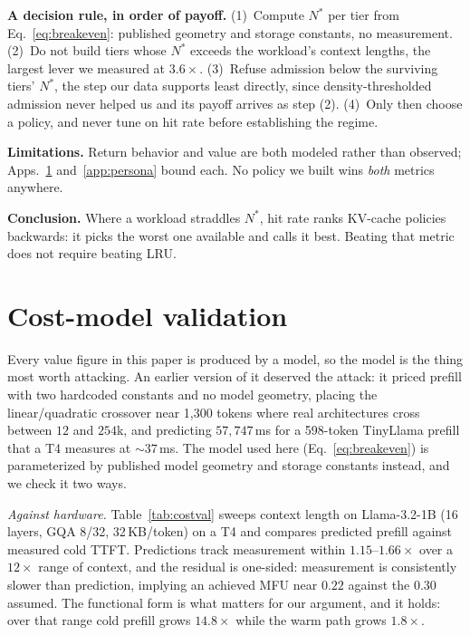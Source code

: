 \documentclass{article}
\begin{document}
\textbf{A decision rule, in order of payoff.} (1)~Compute $N^{*}$ per tier from Eq.~\ref{eq:breakeven}: published geometry and storage constants, no measurement. (2)~Do not build tiers whose $N^{*}$ exceeds the workload's context lengths, the largest lever we measured at $3.6\times$. (3)~Refuse admission below the surviving tiers' $N^{*}$, the step our data supports least directly, since density-thresholded admission never helped us and its payoff arrives as step (2). (4)~Only then choose a policy, and never tune on hit rate before establishing the regime.

\textbf{Limitations.} Return behavior and value are both modeled rather than observed; Apps.~\ref{app:cost} and~\ref{app:persona} bound each. No policy we built wins \emph{both} metrics anywhere.

\textbf{Conclusion.} Where a workload straddles $N^{*}$, hit rate ranks KV-cache policies backwards: it picks the worst one available and calls it best. Beating that metric does not require beating LRU.




\appendix

\section{Cost-model validation}
\label{app:cost}

Every value figure in this paper is produced by a model, so the model is the thing most
worth attacking. An earlier version of it deserved the attack: it priced prefill with two
hardcoded constants and no model geometry, placing the linear/quadratic crossover near
1{,}300 tokens where real architectures cross between $12$ and $254$k, and predicting
$57{,}747$\,ms for a 598-token TinyLlama prefill that a T4 measures at ${\sim}37$\,ms. The
model used here (Eq.~\ref{eq:breakeven}) is parameterized by published model geometry and
storage constants instead, and we check it two ways.

\emph{Against hardware.} Table~\ref{tab:costval} sweeps context length on Llama-3.2-1B
(16 layers, GQA 8/32, 32\,KB/token) on a T4 and compares predicted prefill against
measured cold TTFT. Predictions track measurement within $1.15$--$1.66\times$ over a
$12\times$ range of context, and the residual is one-sided: measurement is consistently
slower than prediction, implying an achieved MFU near $0.22$ against the $0.30$ assumed.
The functional form is what matters for our argument, and it holds: over that range cold
prefill grows $14.8\times$ while the warm path grows $1.8\times$.
\end{document}
